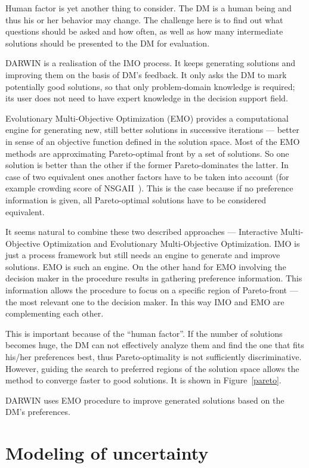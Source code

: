 Human factor is yet another thing to consider. The DM is a human being and
thus his or her behavior may change. The challenge here is to find out what
questions should be asked and how often, as well as how many intermediate
solutions should be presented to the DM for evaluation.

DARWIN is a realisation of the IMO process. It keeps generating solutions and
improving them on the basis of DM's feedback. It only asks the DM to mark
potentially good solutions, so that only problem-domain knowledge is required;
its user does not need to have expert knowledge in the decision support field.

Evolutionary Multi-Objective Optimization (EMO) provides a computational
engine for generating new, still better solutions in successive iterations ---
better in sense of an objective function defined in the solution space. Most
of the EMO methods are approximating Pareto-optimal front by a set of
solutions. So one solution is better than the other if the former
Pareto-dominates the latter. In case of two equivalent ones another factors
have to be taken into account (for example crowding score of
NSGAII~\cite{Deb00}). This is the case because if no preference information is
given, all Pareto-optimal solutions have to be considered equivalent.

It seems natural to combine these two described approaches --- Interactive
Multi-Objective Optimization and Evolutionary Multi-Objective
Optimization. IMO is just a process framework but still needs an engine to
generate and improve solutions. EMO is such an engine. On the other hand for
EMO involving the decision maker in the procedure results in gathering
preference information. This information allows the procedure to focus on a
specific region of Pareto-front --- the most relevant one to the decision
maker. In this way IMO and EMO are complementing each other.

This is important because of the ``human factor''. If the number of solutions
becomes huge, the DM can not effectively analyze them and find the one that
fits his/her preferences best, thus Pareto-optimality is not sufficiently
discriminative. However, guiding the search to preferred regions of the
solution space allows the method to converge faster to good solutions. It is
shown in Figure~\ref{pareto}.

DARWIN uses EMO procedure to improve generated solutions based on the DM's
preferences.


\section{Modeling of uncertainty}
\label{uncert-mod}

